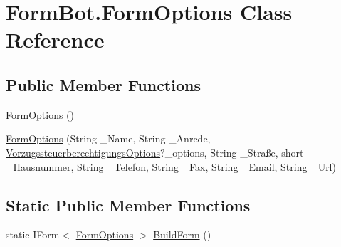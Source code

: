 \hypertarget{class_form_bot_1_1_form_options}{}\section{Form\+Bot.\+Form\+Options Class Reference}
\label{class_form_bot_1_1_form_options}
\subsection*{Public Member Functions}
\begin{DoxyCompactItemize}
\item 
\hyperlink{class_form_bot_1_1_form_options_a3d255582af289f1489da9bf7d48ce15e}{Form\+Options} ()
\item 
\hyperlink{class_form_bot_1_1_form_options_a7423e6b577c9bc06fb745bf47683e552}{Form\+Options} (String \+\_\+\+Name, String \+\_\+\+Anrede, \hyperlink{namespace_form_bot_aebf15a36725c2ee1db3018b157253939}{Vorzugssteuerberechtigungs\+Options}?\+\_\+options, String \+\_\+\+Straße, short \+\_\+\+Hausnummer, String \+\_\+\+Telefon, String \+\_\+\+Fax, String \+\_\+\+Email, String \+\_\+\+Url)
\end{DoxyCompactItemize}
\subsection*{Static Public Member Functions}
\begin{DoxyCompactItemize}
\item 
static I\+Form$<$ \hyperlink{class_form_bot_1_1_form_options}{Form\+Options} $>$ \hyperlink{class_form_bot_1_1_form_options_a8786c10e5efce17c5b572d4a5ed3b695}{Build\+Form} ()
\end{DoxyCompactItemize}
